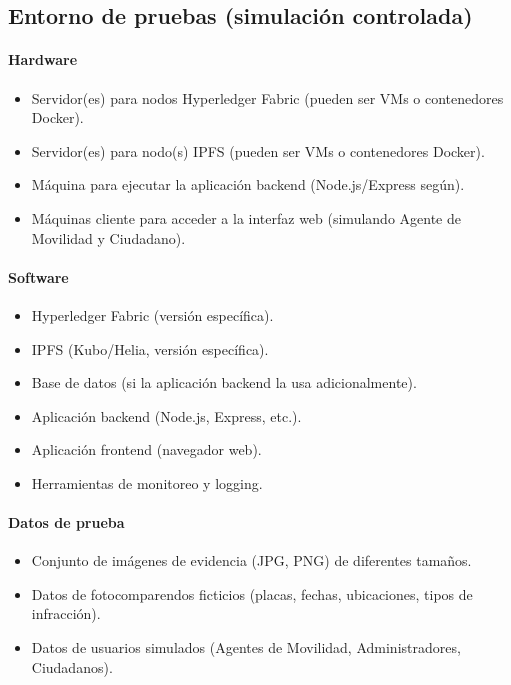 \subsection{Entorno de pruebas (simulación controlada)}
\paragraph{Hardware}
\begin{itemize}
    \item Servidor(es) para nodos Hyperledger Fabric (pueden ser VMs o contenedores Docker). 
    \item Servidor(es) para nodo(s) IPFS (pueden ser VMs o contenedores Docker). 
    \item Máquina para ejecutar la aplicación backend (Node.js/Express según). 
    \item Máquinas cliente para acceder a la interfaz web (simulando Agente de Movilidad y Ciudadano).
\end{itemize}
\paragraph{Software}
\begin{itemize}
    \item Hyperledger Fabric (versión específica). 
    \item IPFS (Kubo/Helia, versión específica).
    \item Base de datos (si la aplicación backend la usa adicionalmente). 
    \item Aplicación backend (Node.js, Express, etc.).
        \item Aplicación frontend (navegador web). 
    \item Herramientas de monitoreo y logging.
\end{itemize}
\paragraph{Datos de prueba}
\begin{itemize}
    \item Conjunto de imágenes de evidencia (JPG, PNG) de diferentes tamaños. 
    \item Datos de fotocomparendos ficticios (placas, fechas, ubicaciones, tipos de infracción). 
    \item Datos de usuarios simulados (Agentes de Movilidad, Administradores, Ciudadanos).
\end{itemize}

